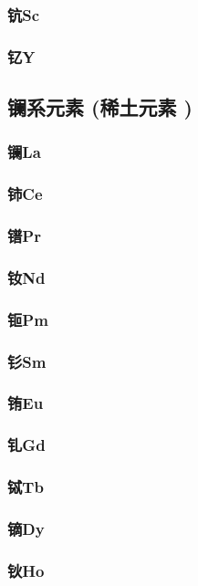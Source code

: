 \documentclass[UTF8]{../03-Chemistry}
\begin{document}
        \subsubsection{钪Sc}
        \subsubsection{钇Y}
    \subsection{镧系元素 (稀土元素 )}
        \subsubsection{镧La}
        \subsubsection{铈Ce}
        \subsubsection{镨Pr}
        \subsubsection{钕Nd}
        \subsubsection{钷Pm}
        \subsubsection{钐Sm}
        \subsubsection{铕Eu}
        \subsubsection{钆Gd}
        \subsubsection{铽Tb}
        \subsubsection{镝Dy}
        \subsubsection{钬Ho}
\end{document}
